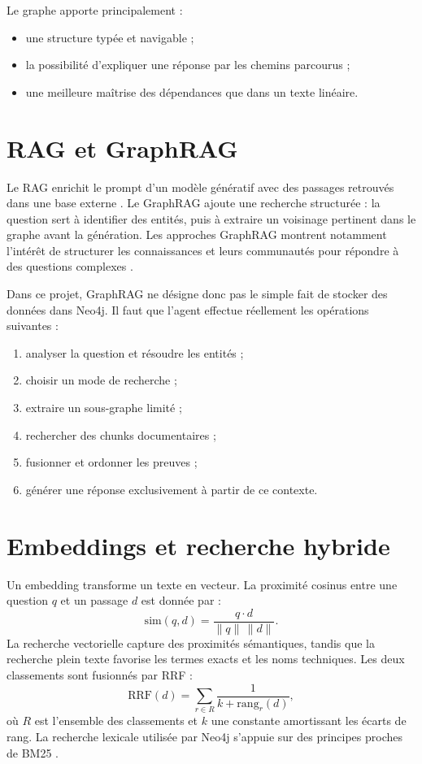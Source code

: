 \documentclass[12pt,a4paper,oneside]{report}
\begin{document}
Le graphe apporte principalement :
\begin{itemize}
  \item une structure typée et navigable ;
  \item la possibilité d'expliquer une réponse par les chemins parcourus ;
  \item une meilleure maîtrise des dépendances que dans un texte linéaire.
\end{itemize}

\section{RAG et GraphRAG}
Le RAG enrichit le prompt d'un modèle génératif avec des passages retrouvés dans une base externe \cite{lewis2020rag}. Le GraphRAG ajoute une recherche structurée : la question sert à identifier des entités, puis à extraire un voisinage pertinent dans le graphe avant la génération. Les approches GraphRAG montrent notamment l'intérêt de structurer les connaissances et leurs communautés pour répondre à des questions complexes \cite{edge2024graphrag}.

Dans ce projet, GraphRAG ne désigne donc pas le simple fait de stocker des données dans Neo4j. Il faut que l'agent effectue réellement les opérations suivantes :
\begin{enumerate}
  \item analyser la question et résoudre les entités ;
  \item choisir un mode de recherche ;
  \item extraire un sous-graphe limité ;
  \item rechercher des chunks documentaires ;
  \item fusionner et ordonner les preuves ;
  \item générer une réponse exclusivement à partir de ce contexte.
\end{enumerate}

\section{Embeddings et recherche hybride}
Un embedding transforme un texte en vecteur. La proximité cosinus entre une question $q$ et un passage $d$ est donnée par :
\begin{equation}
  \mathrm{sim}(q,d)=\frac{q\cdot d}{\lVert q\rVert\,\lVert d\rVert}.
\end{equation}
La recherche vectorielle capture des proximités sémantiques, tandis que la recherche plein texte favorise les termes exacts et les noms techniques. Les deux classements sont fusionnés par RRF :
\begin{equation}
  \mathrm{RRF}(d)=\sum_{r\in R}\frac{1}{k+\mathrm{rang}_{r}(d)},
\end{equation}
où $R$ est l'ensemble des classements et $k$ une constante amortissant les écarts de rang. La recherche lexicale utilisée par Neo4j s'appuie sur des principes proches de BM25 \cite{robertson2009bm25}.
\end{document}
